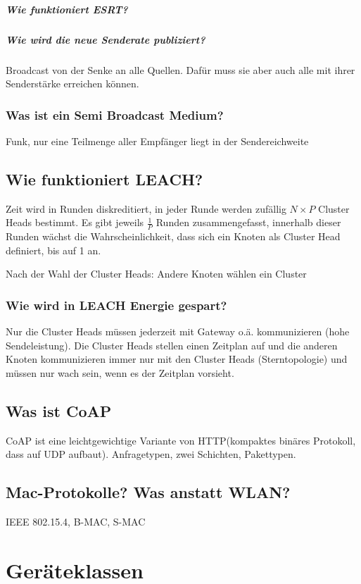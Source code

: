 			\subparagraph{Wie funktioniert ESRT?}
			
			\subparagraph{Wie wird die neue Senderate publiziert?}
			Broadcast von der Senke an alle Quellen. Dafür muss sie aber auch alle mit ihrer Senderstärke erreichen können.
			
		\subsubsection{Was ist ein Semi\- Broadcast Medium?}
		Funk, nur eine Teilmenge aller Empfänger liegt in der Sendereichweite
		
	\subsection{Wie funktioniert LEACH?}
	Zeit wird in Runden diskreditiert, in jeder Runde werden zufällig $N \times P$ Cluster\- Heads bestimmt.
	Es gibt jeweils $\frac{1}{P}$ Runden zusammengefasst, innerhalb dieser Runden wächst die Wahrscheinlichkeit, dass sich ein Knoten als Cluster\- Head definiert, bis auf 1 an. 
	
	Nach der Wahl der Cluster\- Heads: Andere Knoten wählen ein Cluster
	
	
	\subsubsection{Wie wird in LEACH Energie gespart?}
	Nur die Cluster\- Heads müssen jederzeit mit Gateway o.ä. kommunizieren (hohe Sendeleistung).
	Die Cluster\- Heads stellen einen Zeitplan auf und die anderen Knoten kommunizieren immer nur mit den Cluster\- Heads (Sterntopologie) und müssen nur wach sein, wenn es der Zeitplan vorsieht.
	
	\subsection{Was ist CoAP}
	CoAP ist eine leichtgewichtige Variante von HTTP(kompaktes binäres Protokoll, dass auf UDP aufbaut).
	Anfragetypen, zwei Schichten, Pakettypen.
	
	\subsection{Mac-Protokolle? Was anstatt WLAN?}
	IEEE 802.15.4, B-MAC, S-MAC
	
	
\section{Geräteklassen}

